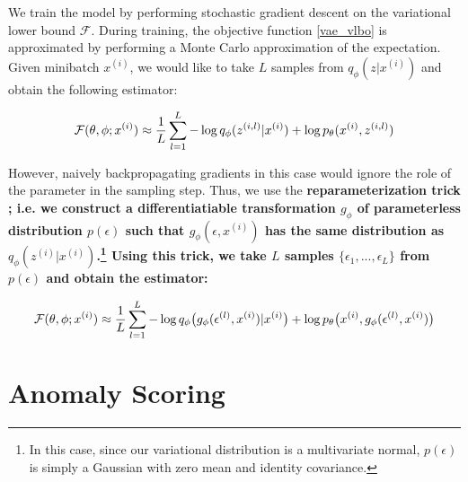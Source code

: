 \documentclass[10pt]{beamer}
\newcommand{\obs}{x^{(i)} }
\newcommand{\alatent}{z^{(i)} }
\begin{document}
\begin{frame}{}

We train the model by performing stochastic gradient descent on the variational lower bound $\mathcal{F}$.  During training, the objective function \eqref{vae_vlbo} is approximated by performing a Monte Carlo approximation of the expectation.   Given minibatch $x^{(i)}$, we would like to take $L$ samples from $q_\phi(z| x^{(i)})$ and obtain the following estimator:

\begin{equation}
\label{vae_sgvb}
 \mathcal{F}(\theta, \phi; x^{(i)}) \approx \displaystyle\frac{1}{L} \displaystyle\sum_{l=1}^L - \log q_\phi(z^{(i,l)} | x^{(i)}) + \log p_\theta( x^{(i)}, z^{(i,l)} ) 
\end{equation} 
\end{frame}

\begin{frame}{}
However, naively backpropagating gradients in this case would ignore the role of the parameter in the sampling step. Thus, we use the \bf{reparameterization trick} ; i.e. we construct a differentiatiable transformation $g_\phi$ of parameterless distribution $p(\epsilon)$ such that $g_\phi(\epsilon, \obs)$ has the same distribution as $q_\phi(\alatent| x^{(i)})$.\footnote{In this case, since our variational distribution is a multivariate normal, $p(\epsilon)$ is simply a Gaussian with zero mean and identity covariance.}  Using this trick, we take $L$ samples $\{\epsilon_1, ..., \epsilon_L \}$ from $p(\epsilon)$ and obtain the estimator: 

\begin{equation}
\label{vae_sgvb}
 \mathcal{F}(\theta, \phi; x^{(i)}) \approx \displaystyle\frac{1}{L} \displaystyle\sum_{l=1}^L - \log q_\phi \big(g_\phi(\epsilon^{(l)}, x^{(i)}) | x^{(i)} \big) + \log p_\theta \big( x^{(i)}, g_\phi(\epsilon^{(l)}, x^{(i)}) \big) 
\end{equation} 

\end{frame}

\section{Anomaly Scoring}
\end{document}
